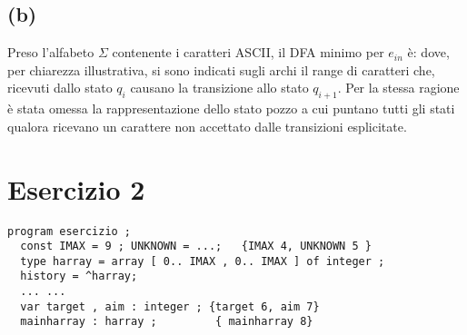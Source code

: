 \documentclass[a4paper,oneside,11pt]{article}
\begin{document}
\subsection*{(b)}
Preso l'alfabeto $\Sigma$ contenente i caratteri ASCII, il DFA minimo per $e_{in}$ è:
\label{dfa}
dove, per chiarezza illustrativa, si sono indicati sugli archi il range di caratteri che, ricevuti dallo stato $q_i$ causano la transizione allo stato $q_{i+1}$. Per la stessa ragione è stata omessa la rappresentazione dello stato pozzo a cui puntano tutti gli stati qualora ricevano un carattere non accettato dalle transizioni esplicitate.
\newpage
\section*{Esercizio 2}
\begin{lstlisting}
program esercizio ;
  const IMAX = 9 ; UNKNOWN = ...;   {IMAX 4, UNKNOWN 5 }
  type harray = array [ 0.. IMAX , 0.. IMAX ] of integer ;
  history = ^harray;
  ... ...
  var target , aim : integer ; {target 6, aim 7}
  mainharray : harray ;         { mainharray 8}


\end{lstlisting}
\end{document}
